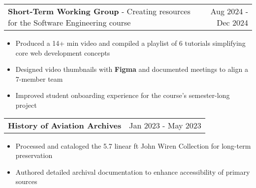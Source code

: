 \documentclass[letterpaper,11pt]{article}
\makeatletter
\newcommand{\resumeItem}[1]{
  \item\small{
    {#1 \vspace{-2pt}}
  }
}
\newcommand{\resumeProjectHeading}[2]{
    \item
    \begin{tabular*}{0.97\textwidth}{l@{\extracolsep{\fill}}r}
      \small#1 & #2 \\
    \end{tabular*}\vspace{-7pt}
}
\newcommand{\resumeItemListStart}{\begin{itemize}}
\newcommand{\resumeItemListEnd}{\end{itemize}\vspace{-5pt}}
\makeatother
\begin{document}


  \resumeProjectHeading{\textbf{Short-Term Working Group} - Creating resources for the Software Engineering course}{Aug 2024 - Dec 2024}
    \resumeItemListStart
      \resumeItem{Produced a 14+ min video and compiled a playlist of 6 tutorials simplifying core web development concepts}
      \resumeItem{Designed video thumbnails with \textbf{Figma} and documented meetings to align a 7-member team}
      \resumeItem{Improved student onboarding experience for the course’s semester-long project}
    \resumeItemListEnd

  \resumeProjectHeading{\textbf{History of Aviation Archives}}{Jan 2023 - May 2023}
    \resumeItemListStart
      \resumeItem{Processed and cataloged the 5.7 linear ft John Wiren Collection for long-term preservation}
      \resumeItem{Authored detailed archival documentation to enhance accessibility of primary sources}
    \resumeItemListEnd
\end{document}
